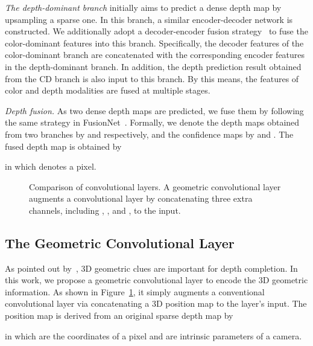 \documentclass[letterpaper, 10 pt, conference]{ieeeconf}
\begin{document}
\textit{The depth-dominant branch} initially aims to predict a dense depth map by upsampling a sparse one. In this branch, a similar encoder-decoder network is constructed. We additionally adopt a decoder-encoder fusion strategy~\cite{Tang2019guided} to fuse the color-dominant features into this branch. Specifically, the decoder features of the color-dominant branch are concatenated with the corresponding encoder features in the depth-dominant branch. In addition, the depth prediction result obtained from the CD branch is also input to this branch. By this means, the features of color and depth modalities are fused at multiple stages. 









\textit{Depth fusion.} As two dense depth maps are predicted, we fuse them by following the same strategy in FusionNet~\cite{Gansbeke2019}. Formally, we denote the depth maps obtained from two branches by  and  respectively, and the confidence maps by  and . The fused depth map is obtained by

in which  denotes a pixel. 






\begin{figure}[t]
	\centering
	\caption{Comparison of convolutional layers. A geometric convolutional layer augments a convolutional layer by concatenating three extra channels, including , , and , to the input.	
	 }
	\label{fig_geoconv}
\end{figure}

\subsection{The Geometric Convolutional Layer} 
As pointed out by~\cite{Chen20192d3d}, 3D geometric clues are important for depth completion. In this work, we propose a geometric convolutional layer to encode the 3D geometric information. As shown in Figure~\ref{fig_geoconv}, it simply augments a conventional convolutional layer via concatenating a 3D position map to the layer's input. The position map  is derived from an original sparse depth map by

in which  are the coordinates of a pixel and  are intrinsic parameters of a camera.
\end{document}

